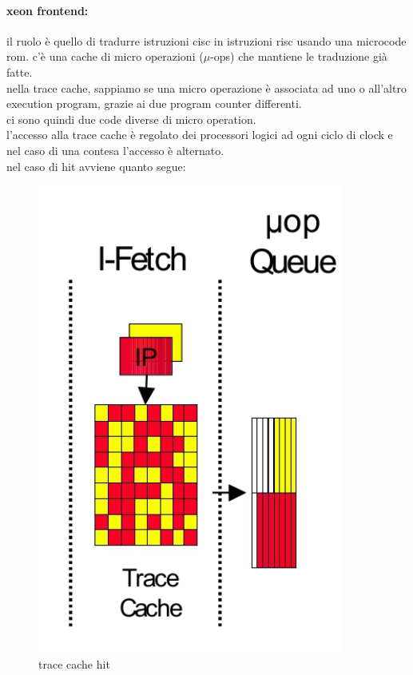 \documentclass[12pt, oneside]{extbook} %
\begin{document}
\paragraph{xeon frontend:}il ruolo è quello di tradurre istruzioni cisc in istruzioni risc usando una microcode rom. c'è una cache di micro operazioni ($\mu$-ops) che mantiene le traduzione già fatte.\\ nella trace cache, sappiamo se una micro operazione è associata ad uno o all'altro execution program, grazie ai due program counter differenti.\\ci sono quindi due code diverse di micro operation.\\l'accesso alla trace cache è regolato dei processori logici ad ogni ciclo di clock e nel caso di una contesa l'accesso è alternato.\\nel caso di hit avviene quanto segue:\\
\begin{figure}
	\includegraphics[scale=0.5]{immagini/trace_cache_hit.png}
	\caption{trace cache hit}
\end{figure}
\\\\
\end{document}

